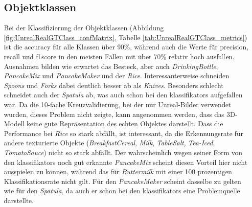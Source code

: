 \subsection{Objektklassen}

Bei der Klassifizierung der Objektklassen (Abbildung \ref{fig:UnrealRealGTClass_confMatrix}, Tabelle \ref{tab:UnrealRealGTClass_metrics}) ist die \gls{accuracy} für alle Klassen über 90\%, während auch die Werte für \gls{precision}, \gls{recall} und \gls{f1score} in den meisten Fällen mit über 70\% relativ hoch ausfallen. Ausnahmen bilden wie erwartet das Besteck, aber auch \textit{DrinkingBottle}, \textit{PancakeMix} und \textit{PancakeMaker} und der \textit{Rice}. Interessanterweise schneiden \textit{Spoons} und \textit{Forks} dabei deutlich besser ab als \textit{Knives}. Besonders schlecht schneidet auch der \textit{Spatula} ab, was auch schon bei den \glspl{klassifikator} aufgefallen war. Da die 10-fache Kreuzvalidierung, bei der nur Unreal-Bilder verwendet wurden, dieses Problem nicht zeigte, kann angenommen werden, dass das 3D-Modell keine gute Repräsentation des echten Objektes darstellt. Dass die Performance bei \textit{Rice} so stark abfällt, ist interessant, da die Erkennungsrate für andere texturierte Objekte (\textit{BreakfastCereal}, \textit{Milk}, \textit{TableSalt}, \textit{Tea-Iced}, \textit{TomatoSauce}) nicht so stark abfällt. Der wahrscheinlich wegen seiner Form von den \glspl{klassifikator} noch gut erkannte \textit{PancakeMix} scheint diesen Vorteil hier nicht ausspielen zu können, während das für \textit{Buttermilk} mit einer 100 prozentigen Klassifikationsrate nicht gilt. Für den \textit{PancakeMaker} scheint dasselbe zu gelten wie für den \textit{Spatula}, da auch er schon bei den \glspl{klassifikator} eine Problemquelle darstellte. 

